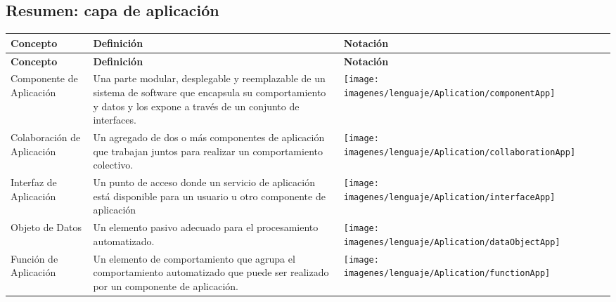 \subsection{Resumen: capa de aplicación}
\begin{center}
\begin{longtable}{| >{\centering\arraybackslash}m{3cm} | >{\arraybackslash}m{6cm} | p{4cm} | p{5cm} | p{4cm} |}
	
		\hline
		\textbf{Concepto} &  \centering \textbf{Definición} & \textbf{Notación} \\
		\hline
		\endfirsthead
		
		
		\hline
		\textbf{Concepto} &  \centering \textbf{Definición} & \textbf{Notación} \\
		\hline
		\endhead
		
		Componente de Aplicación & 
		\vspace{1mm} Una parte modular, desplegable y reemplazable de un sistema de software que encapsula su comportamiento y datos y los expone a través de un conjunto de interfaces. & 
		\texttt{[image: imagenes/lenguaje/Aplication/componentApp]}\\ 
		\hline
		
		Colaboración de Aplicación & 
		\vspace{1mm} 
		 Un agregado de dos o más componentes de aplicación que trabajan juntos para realizar un comportamiento colectivo.& 
		\texttt{[image: imagenes/lenguaje/Aplication/collaborationApp]}\\ 
		\hline
		
		Interfaz de Aplicación &
		\vspace{1mm} Un punto de acceso donde un servicio de aplicación está disponible para un usuario u otro componente de aplicación &  
		\texttt{[image: imagenes/lenguaje/Aplication/interfaceApp]}\\ 
		\hline
				
		Objeto de Datos &
		\vspace{1mm} Un elemento pasivo adecuado para el procesamiento automatizado.& 
		\texttt{[image: imagenes/lenguaje/Aplication/dataObjectApp]}  \\ 
		\hline
		
		Función de Aplicación & 
		\vspace{1mm} Un elemento de comportamiento que agrupa el comportamiento automatizado que puede ser realizado por un componente de aplicación.& 
		\texttt{[image: imagenes/lenguaje/Aplication/functionApp]}  \\ 
		\hline 
		

\end{longtable}
\end{center}
